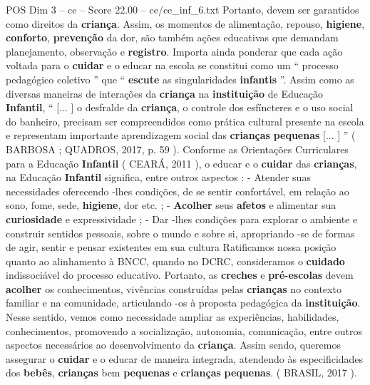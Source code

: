 \begin{textsample}{POS Dim 3 – ce – Score 22.00 – ce/ce\_inf\_6.txt}
Portanto, devem ser garantidos como direitos da \textbf{criança}.
Assim, os momentos de alimentação, repouso, \textbf{higiene}, \textbf{conforto}, \textbf{prevenção} da dor, são também ações educativas que demandam planejamento, observação e \textbf{registro}.
Importa ainda ponderar que cada ação voltada para o \textbf{cuidar} e o educar na escola se constitui como um “ processo pedagógico coletivo ” que “ \textbf{escute} as singularidades \textbf{infantis} ”.
Assim como as diversas maneiras de interações da \textbf{criança} na \textbf{instituição} de Educação \textbf{Infantil}, “ [... ] o desfralde da \textbf{criança}, o controle dos esfíncteres e o uso social do banheiro, precisam ser compreendidos como prática cultural presente na escola e representam importante aprendizagem social das \textbf{crianças} \textbf{pequenas} [... ] ” ( BARBOSA ; QUADROS, 2017, p. 59 ).
Conforme as Orientações Curriculares para a Educação \textbf{Infantil} ( CEARÁ, 2011 ), o educar e o \textbf{cuidar} das \textbf{crianças}, na Educação \textbf{Infantil} significa, entre outros aspectos : - Atender suas necessidades oferecendo -lhes condições, de se sentir confortável, em relação ao sono, fome, sede, \textbf{higiene}, dor etc. ; - \textbf{Acolher} seus \textbf{afetos} e alimentar sua \textbf{curiosidade} e expressividade ; - Dar -lhes condições para explorar o ambiente e construir sentidos pessoais, sobre o mundo e sobre si, apropriando -se de formas de agir, sentir e pensar existentes em sua cultura Ratificamos nossa posição quanto ao alinhamento à BNCC, quando no DCRC, consideramos o \textbf{cuidado} indissociável do processo educativo.
Portanto, as \textbf{creches} e \textbf{pré-escolas} devem \textbf{acolher} os conhecimentos, vivências construídas pelas \textbf{crianças} no contexto familiar e na comunidade, articulando -os à proposta pedagógica da \textbf{instituição}.
Nesse sentido, vemos como necessidade ampliar as experiências, habilidades, conhecimentos, promovendo a socialização, autonomia, comunicação, entre outros aspectos necessários ao desenvolvimento da \textbf{criança}.
Assim sendo, queremos assegurar o \textbf{cuidar} e o educar de maneira integrada, atendendo às especificidades dos \textbf{bebês}, \textbf{crianças} bem \textbf{pequenas} e \textbf{crianças} \textbf{pequenas}. ( BRASIL, 2017 ).

\end{textsample}
